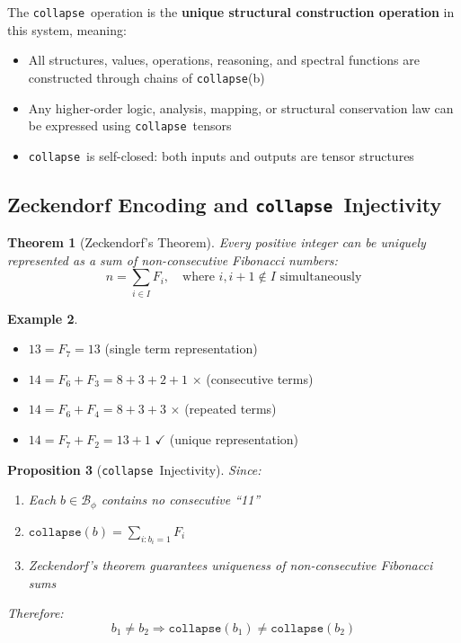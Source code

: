 \documentclass[12pt,a4paper]{article}
\theoremstyle{plain}
\newtheorem{theorem}{Theorem}[section]
\newtheorem{proposition}[theorem]{Proposition}
\theoremstyle{definition}
\newtheorem{example}[theorem]{Example}
\theoremstyle{remark}
\newcommand{\collapse}{\texttt{collapse}}
\newcommand{\Bphi}{\mathcal{B}_\phi}
\begin{document}
The \collapse\ operation is the \textbf{unique structural construction operation} in this system, meaning:

\begin{itemize}
\item All structures, values, operations, reasoning, and spectral functions are constructed through chains of \collapse(b)
\item Any higher-order logic, analysis, mapping, or structural conservation law can be expressed using \collapse\ tensors
\item \collapse\ is self-closed: both inputs and outputs are tensor structures
\end{itemize}

\subsection{Zeckendorf Encoding and \collapse\ Injectivity}

\begin{theorem}[Zeckendorf's Theorem]
Every positive integer can be uniquely represented as a sum of non-consecutive Fibonacci numbers:
\begin{equation}
n = \sum_{i \in I} F_i, \quad \text{where } i, i+1 \notin I \text{ simultaneously}
\end{equation}
\end{theorem}

\begin{example}
\begin{itemize}
\item $13 = F_7 = 13$ (single term representation)
\item $14 = F_6 + F_3 = 8 + 3 + 2 + 1$ $\times$ (consecutive terms)
\item $14 = F_6 + F_4 = 8 + 3 + 3$ $\times$ (repeated terms)
\item $14 = F_7 + F_2 = 13 + 1$ $\checkmark$ (unique representation)
\end{itemize}
\end{example}

\begin{proposition}[\collapse\ Injectivity]
Since:
\begin{enumerate}
\item Each $b \in \Bphi$ contains no consecutive ``11''
\item $\collapse(b) = \sum_{i: b_i=1} F_i$
\item Zeckendorf's theorem guarantees uniqueness of non-consecutive Fibonacci sums
\end{enumerate}
Therefore:
\begin{equation}
\boxed{
b_1 \neq b_2 \Rightarrow \collapse(b_1) \neq \collapse(b_2)
}
\end{equation}
\end{proposition}
\end{document}
